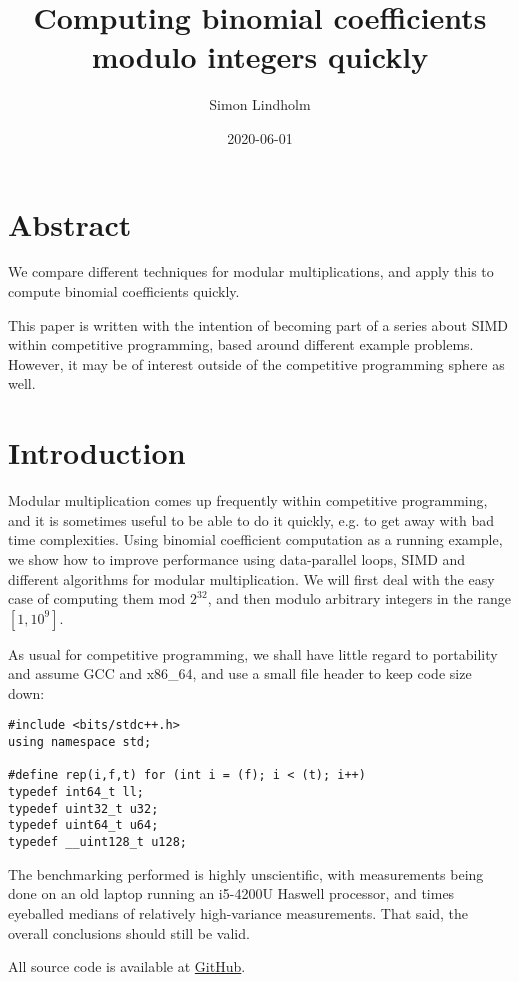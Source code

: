 \documentclass{article}
\title{Computing binomial coefficients modulo integers quickly}
\author{Simon Lindholm}
\date{2020-06-01}
\begin{document}
\maketitle

\section*{Abstract}
We compare different techniques for modular multiplications, and apply this to compute binomial coefficients quickly.

This paper is written with the intention of becoming part of a series about SIMD within competitive programming, based around different example problems.
However, it may be of interest outside of the competitive programming sphere as well.

\tableofcontents

\section{Introduction}

Modular multiplication comes up frequently within competitive programming,
and it is sometimes useful to be able to do it quickly, e.g. to get away
with bad time complexities.
Using binomial coefficient computation as a running example, we show how
to improve performance using data-parallel loops, SIMD and different
algorithms for modular multiplication.
We will first deal with the easy case of computing them mod $2^{32}$, and
then modulo arbitrary integers in the range $[1, 10^9]$.

As usual for competitive programming, we shall have
little regard to portability and assume GCC and x86\_64,
and use a small file header to keep code size down:

\begin{lstlisting}
#include <bits/stdc++.h>
using namespace std;

#define rep(i,f,t) for (int i = (f); i < (t); i++)
typedef int64_t ll;
typedef uint32_t u32;
typedef uint64_t u64;
typedef __uint128_t u128;
\end{lstlisting}

The benchmarking performed is highly unscientific,
with measurements being done on an old laptop running an i5-4200U Haswell processor,
and times eyeballed medians of relatively high-variance measurements.
That said, the overall conclusions should still be valid.

All source code is available at \href{https://github.com/simonlindholm/simd-book/tree/master/binomial-coefficients}{GitHub}.




\end{document}
